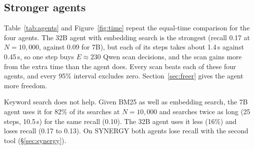 \documentclass[11pt]{article}
\begin{document}
\subsection{Stronger agents}
\label{sec:agents}

Table~\ref{tab:agents} and Figure~\ref{fig:time} repeat the equal-time
comparison for the four agents. The 32B agent with embedding search is the
strongest (recall 0.17 at $N=10{,}000$, against 0.09 for 7B), but each of its
steps takes about 1.4\,s against 0.45\,s, so one step buys $E \approx 230$ Qwen
scan decisions, and the scan gains more from the extra time than the agent
does. Every scan beats each of these four agents, and every 95\% interval
excludes zero. Section~\ref{sec:freer} gives the agent more freedom.

Keyword search does not help. Given BM25 as well as embedding search, the 7B
agent uses it for 82\% of its searches at $N=10{,}000$ and searches twice as long
(25 steps, 10.5\,s) for the same recall (0.10). The 32B agent uses it less (16\%)
and loses recall (0.17 to 0.13). On SYNERGY both agents lose recall with the
second tool (\S\ref{sec:synergy}).
\end{document}
